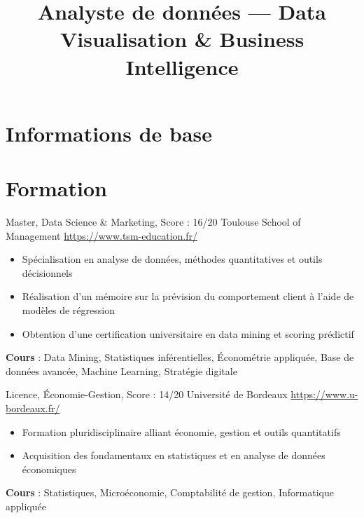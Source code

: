 \documentclass[a4paper, serif, 10pt]{moderncv}
\title{Analyste de données — Data Visualisation \& Business Intelligence}
\begin{document}
\maketitle

\section{Informations de base}

\section{Formation}

        {Master, Data Science \& Marketing, Score : 16/20}
        {Toulouse School of Management}
        {\url{https://www.tsm-education.fr/}}
        {}
        {\begin{itemize}
\item Spécialisation en analyse de données, méthodes quantitatives et outils décisionnels
\item Réalisation d'un mémoire sur la prévision du comportement client à l'aide de modèles de régression
\item Obtention d'une certification universitaire en data mining et scoring prédictif
\end{itemize}
\textbf{Cours} : Data Mining, Statistiques inférentielles, Économétrie appliquée, Base de données avancée, Machine Learning, Stratégie digitale}

        {Licence, Économie-Gestion, Score : 14/20}
        {Université de Bordeaux}
        {\url{https://www.u-bordeaux.fr/}}
        {}
        {\begin{itemize}
\item Formation pluridisciplinaire alliant économie, gestion et outils quantitatifs
\item Acquisition des fondamentaux en statistiques et en analyse de données économiques
\end{itemize}
\textbf{Cours} : Statistiques, Microéconomie, Comptabilité de gestion, Informatique appliquée}
\end{document}
